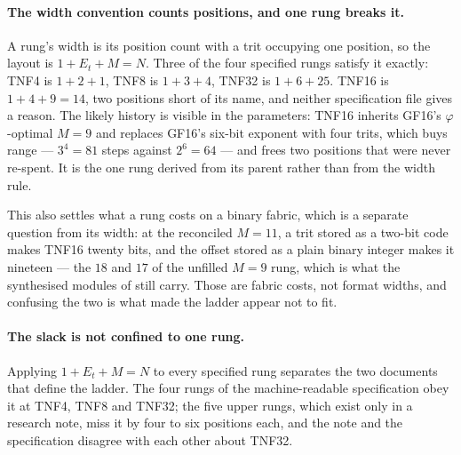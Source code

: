 \paragraph{The width convention counts positions, and one rung breaks it.}
A rung's width is its position count with a trit occupying one position, so the
layout is $1 + E_t + M = N$. Three of the four specified rungs satisfy it exactly:
TNF4 is $1+2+1$, TNF8 is $1+3+4$, TNF32 is $1+6+25$. TNF16 is
$1+4+9 = 14$, two positions short of its name, and neither specification file
gives a reason. The likely history is visible in the parameters: TNF16 inherits
GF16's $\varphi$-optimal $M = 9$ and replaces GF16's six-bit exponent with four
trits, which buys range --- $3^4 = 81$ steps against $2^6 = 64$ --- and frees two
positions that were never re-spent. It is the one rung derived from its parent
rather than from the width rule.

This also settles what a rung costs on a binary fabric, which is a separate
question from its width: at the reconciled $M = 11$, a trit stored as a two-bit
code makes TNF16 twenty bits, and the offset stored as a plain binary integer
makes it nineteen --- the $18$ and $17$ of the unfilled $M = 9$ rung, which is
what the synthesised modules of  still carry. Those
are fabric costs, not format widths, and confusing the two is what made the
ladder appear not to fit.

\paragraph{The slack is not confined to one rung.} Applying $1 + E_t + M = N$ to
every specified rung separates the two documents that define the ladder. The four
rungs of the machine-readable specification obey it at TNF4, TNF8 and TNF32;
the five upper rungs, which exist only in a research note, miss it by four to six
positions each, and the note and the specification disagree with each other about
TNF32.

